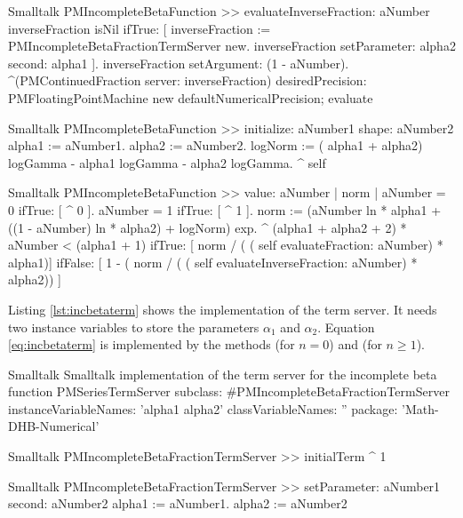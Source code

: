 \begin{displaycode}{Smalltalk}
PMIncompleteBetaFunction >> evaluateInverseFraction: aNumber
    inverseFraction isNil 
        ifTrue: 
            [ inverseFraction := PMIncompleteBetaFractionTermServer new.
            inverseFraction setParameter: alpha2 second: alpha1 ].
    inverseFraction setArgument: (1 - aNumber).
    ^(PMContinuedFraction server: inverseFraction)
        desiredPrecision: PMFloatingPointMachine new defaultNumericalPrecision;
        evaluate
\end{displaycode}

\begin{displaycode}{Smalltalk}
PMIncompleteBetaFunction >> initialize: aNumber1 shape: aNumber2
    alpha1 := aNumber1.
    alpha2 := aNumber2.
    logNorm := ( alpha1 + alpha2) logGamma - alpha1 logGamma - alpha2 logGamma.
    ^ self
\end{displaycode}

\begin{displaycode}{Smalltalk}
PMIncompleteBetaFunction >> value: aNumber
    | norm |
    aNumber = 0
        ifTrue: [ ^ 0 ].
    aNumber = 1
        ifTrue: [ ^ 1 ].
    norm :=  (aNumber ln * alpha1 + ((1 - aNumber) ln * alpha2) + logNorm) exp.
    ^ (alpha1 + alpha2 + 2) * aNumber < (alpha1 + 1)
        ifTrue: [ norm / ( ( self evaluateFraction: aNumber) * alpha1)]
        ifFalse: [ 1 - ( norm / ( ( self evaluateInverseFraction: aNumber) * alpha2)) ]
\end{displaycode}

Listing \ref{lst:incbetaterm} shows the implementation of the term
server. It needs two instance variables to store the parameters
$\alpha_1$ and $\alpha_2$. Equation \ref{eq:incbetaterm} is
implemented by the methods  (for $n=0$) and  (for $n\ge 1$).

\begin{listing}[label=lst:incbetaterm]{Smalltalk}
{Smalltalk implementation of the term server for the incomplete beta function}
PMSeriesTermServer subclass: #PMIncompleteBetaFractionTermServer
   instanceVariableNames: 'alpha1 alpha2'
   classVariableNames: ''
   package: 'Math-DHB-Numerical'
\end{listing}

\begin{displaycode}{Smalltalk}
PMIncompleteBetaFractionTermServer >> initialTerm
    ^ 1
\end{displaycode}

\begin{displaycode}{Smalltalk}
PMIncompleteBetaFractionTermServer >> setParameter: aNumber1 second: aNumber2
    alpha1 := aNumber1.
    alpha2 := aNumber2
\end{displaycode}

